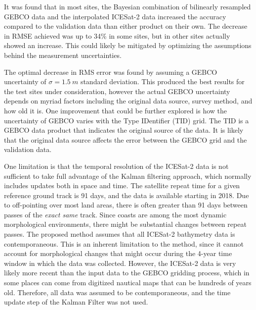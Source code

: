 It was found that in most sites, the Bayesian combination of bilinearly resampled GEBCO data and the interpolated ICESat-2 data increased the accuracy compared to the validation data than either product on their own. The decrease in RMSE achieved was up to 34\% in some sites, but in other sites actually showed an increase. This could likely be mitigated by optimizing the assumptions behind the measurement uncertainties.



The optimal decrease in RMS error was found by assuming a GEBCO uncertainty of $\sigma=1.5~m$ standard deviation. This produced the best results for the test sites under consideration, however the actual GEBCO uncertainty depends on myriad factors including the original data source, survey method, and how old it is. One improvement that could be further explored is how the uncertainty of GEBCO varies with the Type IDentifier (TID) grid. The TID is a GEBCO data product that indicates the original source of the data. It is likely that the original data source affects the error between the GEBCO grid and the validation data.

One limitation is that the temporal resolution of the ICESat-2 data is not sufficient to take full advantage of the Kalman filtering approach, which normally includes updates both in space and time. The satellite repeat time for a given reference ground track is 91 days, and the data is available starting in 2018. Due to off-pointing over most land areas, there is often greater than 91 days between passes of the \emph{exact same} track. Since coasts are among the most dynamic morphological environments, there might be substantial changes between repeat passes. The proposed method assumes that all ICESat-2 bathymetry data is contemporaneous. This is an inherent limitation to the method, since it cannot account for morphological changes that might occur during the 4-year time window in which the data was collected. However, the ICESat-2 data is very likely more recent than the input data to the GEBCO gridding process, which in some places can come from digitized nautical maps that can be hundreds of years old. Therefore, all data was assumed to be contemporaneous, and the time update step of the Kalman Filter was not used.

